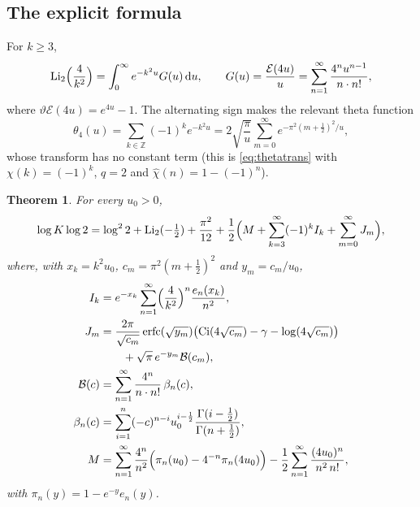 \documentclass[11pt,reqno]{amsart}
\newtheorem{theorem}{Theorem}[section]
\theoremstyle{definition}
\theoremstyle{remark}
\newcommand{\Eip}{\mathcal{E}}
\newcommand{\erfc}{\operatorname{erfc}}
\newcommand{\Ci}{\operatorname{Ci}}
\newcommand{\Li}{\operatorname{Li}}
\newcommand{\dd}{\,\mathrm{d}}
\newcommand{\ZZ}{\mathbb{Z}}
\begin{document}
\subsection{The explicit formula}

For $k \ge 3$,
\[
  \Li_2\Bigl(\frac4{k^2}\Bigr) = \int_0^\infty e^{-k^2u} G(u)\dd u, \qquad
  G(u) = \frac{\Eip(4u)}{u} = \sum_{n=1}^{\infty}\frac{4^nu^{n-1}}{n\cdot n!},
\]
where $\vartheta\Eip(4u) = e^{4u} - 1$.
The alternating sign makes the relevant theta function
\[
  \theta_4(u) = \sum_{k\in\ZZ}(-1)^ke^{-k^2u} = 2\sqrt{\frac{\pi}{u}}\sum_{m=0}^{\infty}e^{-\pi^2(m+\frac12)^2/u},
\]
whose transform has no constant term (this is
\eqref{eq:thetatrans} with $\chi(k) = (-1)^k$, $q = 2$ and $\hat\chi(n) = 1 - (-1)^n$).

\begin{theorem}\label{thm:khinchin}
For every $u_0 > 0$,
\[
  \log K\log 2 = \log^2 2 + \Li_2(-\tfrac12) + \frac{\pi^2}{12} + \frac12\Bigl(M + \sum_{k=3}^{\infty}(-1)^kI_k + \sum_{m=0}^{\infty}J_m\Bigr),
\]
where, with $x_k = k^2u_0$, $c_m = \pi^2(m+\frac12)^2$ and $y_m = c_m/u_0$,
\begin{align*}
  I_k &= e^{-x_k}\sum_{n=1}^{\infty}\Bigl(\frac{4}{k^2}\Bigr)^n\frac{e_n(x_k)}{n^2}, \\
  J_m &= \frac{2\pi}{\sqrt{c_m}}\erfc(\sqrt{y_m})\bigl(\Ci(4\sqrt{c_m}) - \gamma - \log(4\sqrt{c_m})\bigr) \\
      &\qquad + \sqrt\pi\, e^{-y_m}\mathcal B(c_m), \\
  \mathcal B(c) &= \sum_{n=1}^{\infty}\frac{4^n}{n\cdot n!}\,\beta_n(c), \\
  \beta_n(c) &= \sum_{i=1}^{n}(-c)^{n-i}u_0^{i-\frac12}\frac{\Gamma(i-\frac12)}{\Gamma(n+\frac12)}, \\
  M &= \sum_{n=1}^{\infty}\frac{4^n}{n^2}\Bigl(\pi_n(u_0) - 4^{-n}\pi_n(4u_0)\Bigr) - \frac12\sum_{n=1}^{\infty}\frac{(4u_0)^n}{n^2\,n!},
\end{align*}
with $\pi_n(y) = 1 - e^{-y}e_n(y)$.
\end{theorem}
\end{document}
